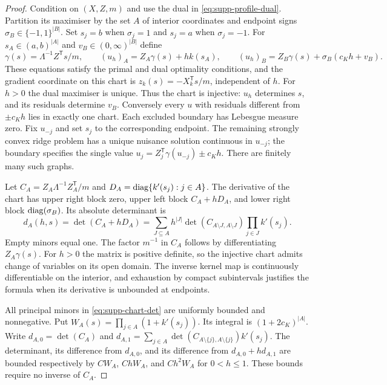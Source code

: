 \begin{proof}
Condition on $(X,Z,m)$ and use the dual in
\eqref{eq:supp-profile-dual}. Partition its maximiser by the set $A$
of interior coordinates and endpoint signs $\sigma_B\in\{-1,1\}^{|B|}$.
Set $s_j=b$ when $\sigma_j=1$ and $s_j=a$ when $\sigma_j=-1$.
For $s_A\in(a,b)^{|A|}$ and $v_B\in(0,\infty)^{|B|}$ define
\begin{equation}\label{eq:supp-chart}
 \gamma(s)=\Lambda^{-1}Z^{\mathsf T}s/m,\qquad
 (u_h)_A=Z_A\gamma(s)+hk(s_A),\qquad
 (u_h)_B=Z_B\gamma(s)+\sigma_B(c_Kh+v_B).
\end{equation}
These equations satisfy the primal and dual optimality conditions,
and the gradient coordinate on this chart is
$z_k(s)=-X_k^{\mathsf T}s/m$, independent of $h$.
For $h>0$ the dual maximiser is unique. Thus the chart is injective:
$u_h$ determines $s$, and its residuals determine $v_B$.
Conversely every $u$ with residuals different from $\pm c_Kh$ lies
in exactly one chart. Each excluded boundary has Lebesgue measure
zero. Fix $u_{-j}$ and set $s_j$ to the corresponding endpoint.
The remaining strongly convex ridge problem has a unique nuisance
solution continuous in $u_{-j}$; the boundary specifies the single
value $u_j=Z_j^{\mathsf T}\gamma(u_{-j})\pm c_Kh$.
There are finitely many such graphs.

Let $C_A=Z_A\Lambda^{-1}Z_A^{\mathsf T}/m$ and
$D_A=\operatorname{diag}\{k'(s_j):j\in A\}$. The derivative of the chart has
upper right block zero, upper left block $C_A+hD_A$, and lower
right block $\operatorname{diag}(\sigma_B)$. Its absolute determinant is
\begin{equation}\label{eq:supp-chart-det}
 d_A(h,s)=\det(C_A+hD_A)
 =\sum_{J\subseteq A}h^{|J|}
       \det(C_{A\setminus J,A\setminus J})\prod_{j\in J}k'(s_j).
\end{equation}
Empty minors equal one. The factor $m^{-1}$ in $C_A$ follows by
differentiating $Z_A\gamma(s)$. For $h>0$ the matrix is positive
definite, so the injective chart admits change of variables on its
open domain. The inverse kernel map is continuously differentiable
on the interior, and exhaustion by compact subintervals justifies the
formula when its derivative is unbounded at endpoints.

All principal minors in \eqref{eq:supp-chart-det} are uniformly
bounded and nonnegative. Put $W_A(s)=\prod_{j\in A}(1+k'(s_j))$.
Its integral is $(1+2c_K)^{|A|}$. Write $d_{A,0}=\det(C_A)$ and
$d_{A,1}=\sum_{j\in A}\det(C_{A\setminus\{j\},A\setminus\{j\}})k'(s_j)$.
The determinant, its difference from $d_{A,0}$, and its difference
from $d_{A,0}+hd_{A,1}$ are bounded respectively by
$CW_A$, $ChW_A$, and $Ch^2W_A$ for $0<h\leq1$.
These bounds require no inverse of $C_A$.


\end{proof}

